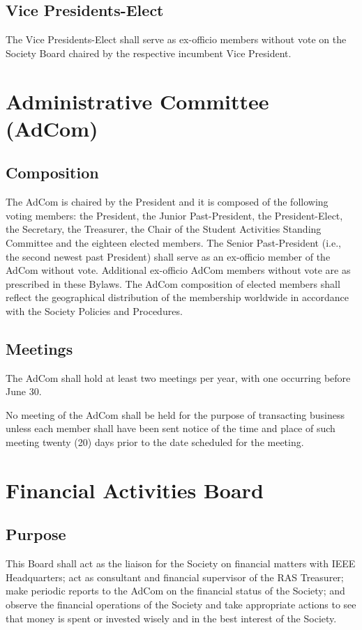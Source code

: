 \documentclass[10pt]{article}
\begin{document}
\subsection{Vice Presidents-Elect}

The Vice Presidents-Elect shall serve as ex-officio members without vote on the Society Board chaired by the respective incumbent Vice President.


\section{Administrative Committee (AdCom)}
\label{AdCom}

\subsection{Composition}
\label{AdCom:Composition}

The AdCom is chaired by the President and it is composed of the following voting members: the President, the Junior Past-President, the President-Elect, the Secretary, the Treasurer, the Chair of the Student Activities Standing Committee and the eighteen elected members. The Senior Past-President (i.e., the second newest past President) shall serve as an ex-officio member of the AdCom without vote. Additional ex-officio AdCom members without vote are as prescribed in these Bylaws. The AdCom composition of elected members shall reflect the geographical distribution of the membership worldwide in accordance with the Society Policies and Procedures.

\subsection{Meetings}

The AdCom shall hold at least two meetings per year,  with one occurring before June 30.

No meeting of the AdCom shall be held for the purpose of transacting business unless each member shall have been sent notice of the time and place of such meeting twenty (20) days prior to the date scheduled for the meeting. 


\section{Financial Activities Board}
\label{FAB}

\subsection{Purpose}
This Board shall act as the liaison for the Society on financial matters with IEEE Headquarters; act as consultant and financial supervisor of the RAS Treasurer; make periodic reports to the AdCom on the financial status of the Society; and observe the financial operations of the Society and take appropriate actions to see that money is spent or invested wisely and in the best interest of the Society.
\end{document}

